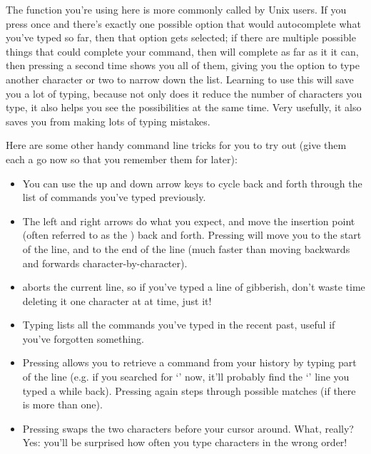 The  function you're using here is more commonly called  by Unix users. If you press  once and there's exactly one possible option that would autocomplete what you've typed so far, then that option gets selected; if there are multiple possible things that could complete your command, then  will complete as far as it it can, then pressing  a second time shows you all of them, giving you the option to type another character or two to narrow down the list. Learning to use this will save you a lot of typing, because not only does it reduce the number of characters you type, it also helps you see the possibilities at the same time. Very usefully, it also saves you from making lots of typing mistakes.



Here are some other handy command line tricks for you to try out (give them each a go now so that you remember them for later):


\begin{itemize}
\item You can use the up and down arrow keys to cycle back and forth through the list of commands you've typed previously.
\item The left and right arrows do what you expect, and move the insertion point (often referred to as the ) back and forth. Pressing  will move you to the start of the line, and  to the end of the line (much faster than moving backwards and forwards character-by-character).
\item {} aborts the current line, so if you've typed a line of gibberish, don't waste time deleting it one character at at time, just  it!
\item Typing  lists all the commands you've typed in the recent past, useful if you've forgotten something.
\item Pressing  allows you to retrieve a command from your history by typing part of the line (e.g. if you searched for `' now, it'll probably find the `' line you typed a while back). Pressing  again steps through possible matches (if there is more than one).
\item Pressing  swaps the two characters before your cursor around. What, really? Yes: you'll be surprised how often you type characters in the wrong order!
\end{itemize}

